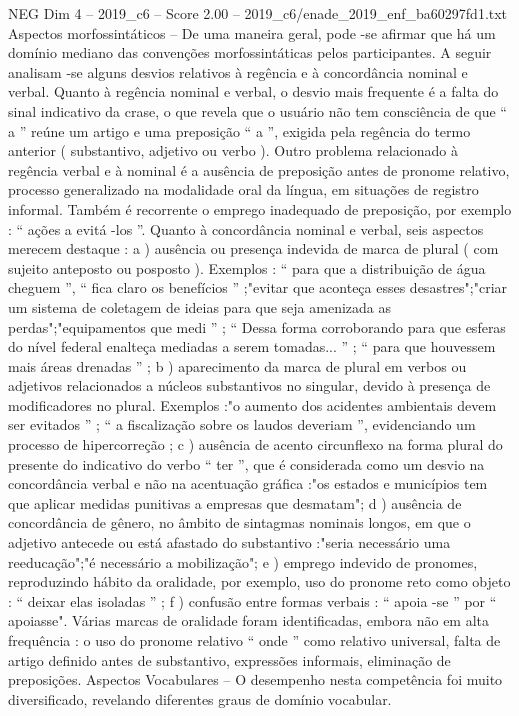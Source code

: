 \begin{textsample}{NEG Dim 4 – 2019\_c6 – Score 2.00 – 2019\_c6/enade\_2019\_enf\_ba60297fd1.txt}
Aspectos morfossintáticos – De uma maneira geral, pode -se afirmar que há um domínio mediano das convenções morfossintáticas pelos participantes.
A seguir analisam -se alguns desvios relativos à regência e à concordância nominal e verbal.
Quanto à regência nominal e verbal, o desvio mais frequente é a falta do sinal indicativo da crase, o que revela que o usuário não tem consciência de que “ a ” reúne um artigo e uma preposição “ a ”, exigida pela regência do termo anterior ( substantivo, adjetivo ou verbo ).
Outro problema relacionado à regência verbal e à nominal é a ausência de preposição antes de pronome relativo, processo generalizado na modalidade oral da língua, em situações de registro informal.
Também é recorrente o emprego inadequado de preposição, por exemplo : “ ações a evitá -los ”.
Quanto à concordância nominal e verbal, seis aspectos merecem destaque : a ) ausência ou presença indevida de marca de plural ( com sujeito anteposto ou posposto ).
Exemplos : “ para que a distribuição de água cheguem ”, “ fica claro os benefícios ” ;"evitar que aconteça esses desastres";"criar um sistema de coletagem de ideias para que seja amenizada as perdas";"equipamentos que medi ” ; “ Dessa forma corroborando para que esferas do nível federal enalteça mediadas a serem tomadas... ” ; “ para que houvessem mais áreas drenadas ” ; b ) aparecimento da marca de plural em verbos ou adjetivos relacionados a núcleos substantivos no singular, devido à presença de modificadores no plural.
Exemplos :"o aumento dos acidentes ambientais devem ser evitados ” ; “ a fiscalização sobre os laudos deveriam ”, evidenciando um processo de hipercorreção ; c ) ausência de acento circunflexo na forma plural do presente do indicativo do verbo “ ter ”, que é considerada como um desvio na concordância verbal e não na acentuação gráfica :"os estados e municípios tem que aplicar medidas punitivas a empresas que desmatam"; d ) ausência de concordância de gênero, no âmbito de sintagmas nominais longos, em que o adjetivo antecede ou está afastado do substantivo :"seria necessário uma reeducação";"é necessário a mobilização"; e ) emprego indevido de pronomes, reproduzindo hábito da oralidade, por exemplo, uso do pronome reto como objeto : “ deixar elas isoladas ” ; f ) confusão entre formas verbais : “ apoia -se ” por “ apoiasse".
Várias marcas de oralidade foram identificadas, embora não em alta frequência : o uso do pronome relativo “ onde ” como relativo universal, falta de artigo definido antes de substantivo, expressões informais, eliminação de preposições.
Aspectos Vocabulares – O desempenho nesta competência foi muito diversificado, revelando diferentes graus de domínio vocabular.

\end{textsample}
